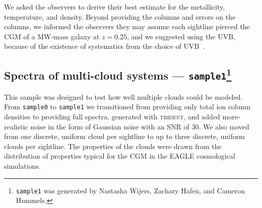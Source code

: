 \documentclass[fleqn,usenatbib]{mnras}
\begin{document}
We asked the observers to derive their best estimate for the metallicity, temperature, and density.
Beyond providing the columns and errors on the columns, we informed the observers they may assume each sightline pierced the CGM of a MW-mass galaxy at $z=0.25$, and we suggested using the \cite{haardt2012RADIATIVE} UVB, because of the existence of systematics from the choice of UVB~\citep{Wotta2016, Wotta2019, acharya2021How,Gibson2022}.

\subsection[Spectra of multi-cloud systems --- \texttt{sample1}]{Spectra of multi-cloud systems --- \texttt{sample1}\footnote{
\texttt{sample1} was generated by Nastasha Wijers, Zachary Hafen, and Cameron Hummels.
}}
\label{s: data generation -- sample1}

This sample was designed to test how well multiple clouds could be modeled.
From \texttt{sample0} to \texttt{sample1} we transitioned from providing only total ion column densities to providing full spectra, generated with \textsc{trident}, and added more-realistic noise in the form of Gaussian noise with an SNR of 30.
We also moved from one discrete, uniform cloud per sightline to up to three discrete, uniform clouds per sightline.
The properties of the clouds were drawn from the distribution of properties typical for the CGM in the \textsc{EAGLE} cosmological simulations.
\end{document}
